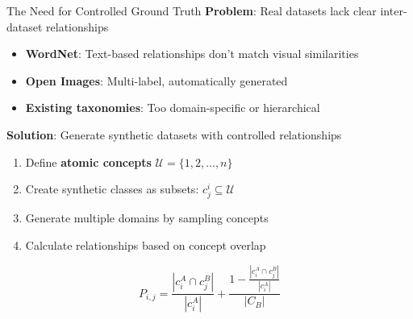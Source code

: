 \documentclass[aspectratio=169]{beamer}
\begin{document}
\begin{frame}{The Need for Controlled Ground Truth}
    \textbf{Problem}: Real datasets lack clear inter-dataset relationships

    \begin{itemize}
        \item \textbf{WordNet}: Text-based relationships don't match visual similarities
        \item \textbf{Open Images}: Multi-label, automatically generated
        \item \textbf{Existing taxonomies}: Too domain-specific or hierarchical
    \end{itemize}

    \vspace{1em}

    \textbf{Solution}: Generate synthetic datasets with controlled relationships

    \begin{enumerate}
        \item Define \textbf{atomic concepts} $\mathcal{U} = \{1,2,\ldots,n\}$
        \item Create synthetic classes as subsets: $c^i_j \subseteq \mathcal{U}$
        \item Generate multiple domains by sampling concepts
        \item Calculate relationships based on concept overlap
    \end{enumerate}

    \vspace{0.5em}

    \begin{equation}
        P_{i,j} = \frac{|c^A_i \cap c^B_j|}{|c^A_i|} + \frac{1 - \frac{|c^A_i \cap c^B_j|}{|c^A_i|}}{|C_B|}
    \end{equation}
\end{frame}
\end{document}
